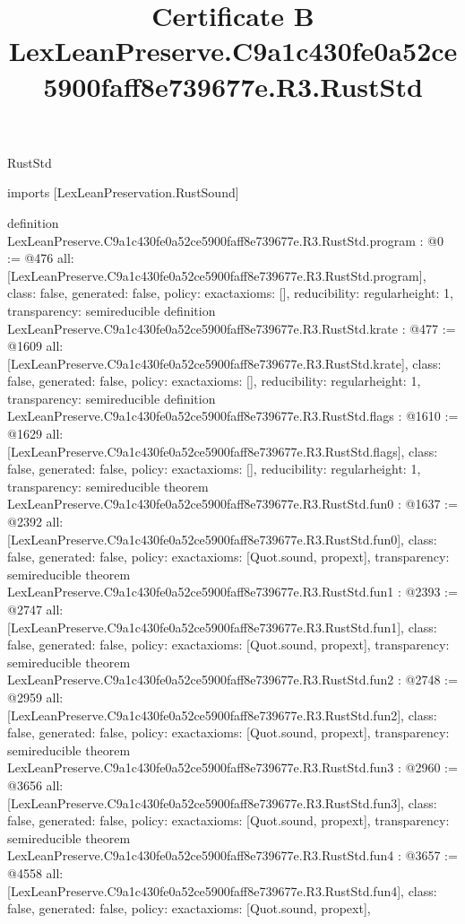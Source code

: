 \begin{lexlean}{RustStd}
\title{Certificate B LexLeanPreserve.C9a1c430fe0a52ce5900faff8e739677e.R3.RustStd}
\begin{coremodule}
imports [LexLeanPreservation.RustSound]

definition LexLeanPreserve.C9a1c430fe0a52ce5900faff8e739677e.R3.RustStd.program : @0 := @476 {
  all: [LexLeanPreserve.C9a1c430fe0a52ce5900faff8e739677e.R3.RustStd.program],
  class: false,
  generated: false,
  policy: exact{axioms: []},
  reducibility: regular{height: 1},
  transparency: semireducible
}
definition LexLeanPreserve.C9a1c430fe0a52ce5900faff8e739677e.R3.RustStd.krate : @477 := @1609 {
  all: [LexLeanPreserve.C9a1c430fe0a52ce5900faff8e739677e.R3.RustStd.krate],
  class: false,
  generated: false,
  policy: exact{axioms: []},
  reducibility: regular{height: 1},
  transparency: semireducible
}
definition LexLeanPreserve.C9a1c430fe0a52ce5900faff8e739677e.R3.RustStd.flags : @1610 := @1629 {
  all: [LexLeanPreserve.C9a1c430fe0a52ce5900faff8e739677e.R3.RustStd.flags],
  class: false,
  generated: false,
  policy: exact{axioms: []},
  reducibility: regular{height: 1},
  transparency: semireducible
}
theorem LexLeanPreserve.C9a1c430fe0a52ce5900faff8e739677e.R3.RustStd.fun0 : @1637 := @2392 {
  all: [LexLeanPreserve.C9a1c430fe0a52ce5900faff8e739677e.R3.RustStd.fun0],
  class: false,
  generated: false,
  policy: exact{axioms: [Quot.sound, propext]},
  transparency: semireducible
}
theorem LexLeanPreserve.C9a1c430fe0a52ce5900faff8e739677e.R3.RustStd.fun1 : @2393 := @2747 {
  all: [LexLeanPreserve.C9a1c430fe0a52ce5900faff8e739677e.R3.RustStd.fun1],
  class: false,
  generated: false,
  policy: exact{axioms: [Quot.sound, propext]},
  transparency: semireducible
}
theorem LexLeanPreserve.C9a1c430fe0a52ce5900faff8e739677e.R3.RustStd.fun2 : @2748 := @2959 {
  all: [LexLeanPreserve.C9a1c430fe0a52ce5900faff8e739677e.R3.RustStd.fun2],
  class: false,
  generated: false,
  policy: exact{axioms: [Quot.sound, propext]},
  transparency: semireducible
}
theorem LexLeanPreserve.C9a1c430fe0a52ce5900faff8e739677e.R3.RustStd.fun3 : @2960 := @3656 {
  all: [LexLeanPreserve.C9a1c430fe0a52ce5900faff8e739677e.R3.RustStd.fun3],
  class: false,
  generated: false,
  policy: exact{axioms: [Quot.sound, propext]},
  transparency: semireducible
}
theorem LexLeanPreserve.C9a1c430fe0a52ce5900faff8e739677e.R3.RustStd.fun4 : @3657 := @4558 {
  all: [LexLeanPreserve.C9a1c430fe0a52ce5900faff8e739677e.R3.RustStd.fun4],
  class: false,
  generated: false,
  policy: exact{axioms: [Quot.sound, propext]},
}
\end{coremodule}
\end{lexlean}
